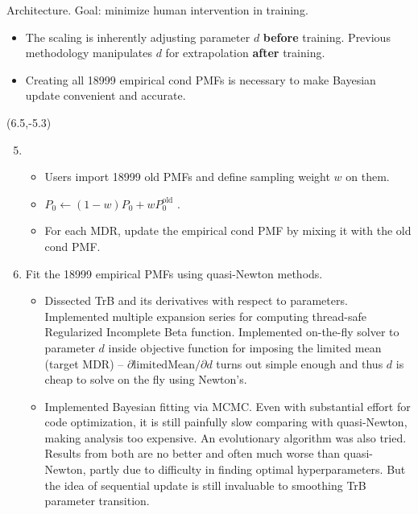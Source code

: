 \documentclass[aspectratio=169]{beamer}
\begin{document}
\begin{frame}{\normalsize Architecture. Goal: minimize human intervention in training.}
\begin{textblock}{7.5}
\begin{enumerate}
\begin{itemize}
\tiny\item The scaling is inherently adjusting parameter $d$ \textbf{before} training. Previous methodology manipulates $d$ for extrapolation \textbf{after} training.\smallskip%

\tiny\item Creating all 18999 empirical cond PMFs is necessary to make Bayesian update convenient and accurate.\smallskip%
\end{itemize}
\end{enumerate}
\end{textblock}

\begin{textblock}{7.9}(6.5,-5.3)
\begin{enumerate}\setcounter{enumi}{4}

\tiny\item \smallskip

\begin{itemize}
\tiny\item Users import 18999 old PMFs and define sampling weight $w$ on them.\smallskip%

\tiny\item $P_0\gets (1-w)P_0 + w P_0^{\text{old}}$ .\smallskip%

\tiny\item For each MDR, update the empirical cond PMF by mixing it with the old cond PMF.\smallskip
\end{itemize}

\tiny\item Fit the 18999 empirical PMFs using quasi-Newton methods.\smallskip

\begin{itemize}
\tiny\item Dissected TrB and its derivatives with respect to parameters. Implemented multiple expansion series for computing thread-safe Regularized Incomplete Beta function. Implemented on-the-fly solver to parameter $d$ inside objective function for imposing the limited mean (target MDR) -- $\partial\text{limitedMean}/\partial d$ turns out simple enough and thus $d$ is cheap to solve on the fly using Newton's. \smallskip%

\tiny\item Implemented Bayesian fitting via MCMC. Even with substantial effort for code optimization, it is still painfully slow comparing with quasi-Newton, making analysis too expensive. An evolutionary algorithm was also tried. Results from both are no better and often much worse than quasi-Newton, partly due to difficulty in finding optimal hyperparameters. But the idea of sequential update is still invaluable to smoothing TrB parameter transition.\smallskip%


\end{itemize}
\end{enumerate}
\end{textblock}
\end{frame}
\end{document}
